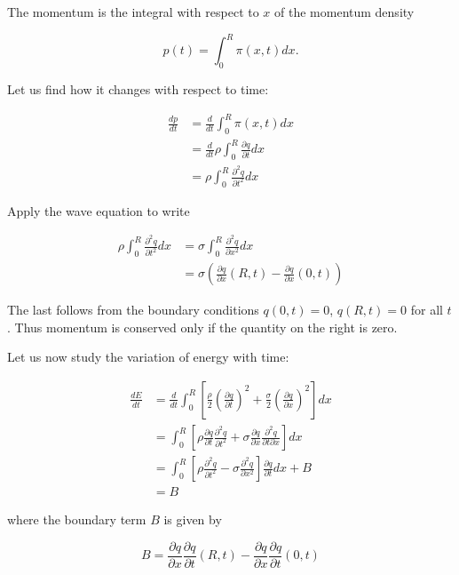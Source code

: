 The momentum is the integral with respect to $x$ of the momentum density

\begin{equation}
p(t) = \int_0^R \pi(x,t) dx .
\end{equation}

Let us find how it changes with respect to time:

\begin{align}
\frac{ dp}{dt} &= \frac{d}{dt} \int_0^R \pi(x,t) dx \\
&= \frac{d}{dt} \rho \int_0^R \frac{\partial q}{\partial t} dx \\
&=  \rho \int_0^R \frac{\partial^2 q}{\partial t^2} dx
\end{align}

Apply the wave equation to write

\begin{align}
\rho \int_0^R \frac{\partial^2 q}{\partial t^2} dx
&= \sigma \int_0^R \frac{\partial^2 q}{\partial x^2} dx  \\
&= \sigma \left(  \frac{\partial q}{\partial x}( R, t ) - \frac{\partial q}{\partial x}(0, t) \right)
\end{align}

The last follows from the boundary conditions $q(0, t) = 0$,
$q(R, t) = 0$ for all $t$.  Thus momentum is conserved only if the quantity on the right is zero.


Let us now study the variation of energy with time:

\begin{align}
\frac{dE}{dt} &= \frac{d}{dt} \int_0^R \left[
\frac{\rho}{2}\left(\frac{\partial q}{\partial t} \right)^2
+
\frac{\sigma}{2} \left(\frac{\partial q}{\partial x} \right)^2
\right] dx \\
&= \int_0^R \left[
\rho\frac{\partial q}{\partial t} \frac{\partial^2 q}{\partial t^2}
+
\sigma \frac{\partial q}{\partial x} \frac{\partial^2 q}{\partial t\partial x}
\right] dx \\
&= \int_0^R \left[
\rho\frac{\partial^2 q}{\partial t^2}
-
\sigma \frac{\partial^2 q}{\partial x^2}
\right] \frac{\partial q}{\partial t} dx  + B\\
&= B
\end{align}

where the boundary term $B$ is given by

\begin{equation}
B = \frac{\partial q}{\partial x}\frac{\partial q}{\partial t}(R,t)
- \frac{\partial q}{\partial x}\frac{\partial q}{\partial t}(0,t)
\end{equation}

